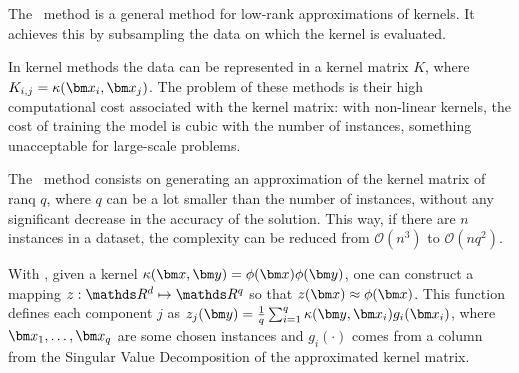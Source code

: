 \section{\Nys}

\begin{pre-delivery}
  The \Nys\ method is a general method for low-rank approximations of
  kernels. It achieves this by subsampling the data on which the kernel
  is evaluated.

  In kernel methods the data can be represented in a kernel matrix $K$, where
  $K_{i,j} = \kernel(\vx_i, \vx_j)$. The problem of these methods is their
  high computational cost associated with the kernel matrix: with non-linear
  kernels, the cost of training the model is cubic with the number of
  instances, something unacceptable for large-scale problems.

  The \Nys\ method consists on generating an approximation of the kernel matrix of
  ranq $q$, where $q$ can be a lot smaller than the number of instances, without
  any significant decrease in the accuracy of the solution. This way, if there
  are $n$ instances in a dataset, the complexity can be reduced from
  $\mathcal{O}(n^3)$ to $\mathcal{O}(nq^2)$.

  With \Nys, given a kernel $\kernel(\vx, \vy) = \phi(\vx)\phi(\vy)$, one can
  construct a mapping $z: \reals^d \mapsto \reals^q$ so that
  $z(\vx) \approx \phi(\vx)$. This function defines each component $j$ as
  $z_j(\vy) = \frac{1}{q}\sum_{i = 1}^q \kernel(\vy, \vx_i)g_i(\vx_i)$,
  where $\vx_1, \ldots, \vx_q$ are some chosen instances and
  $g_i(\cdot)$ comes from a column from the Singular Value Decomposition
  of the approximated kernel matrix.
\end{pre-delivery}
